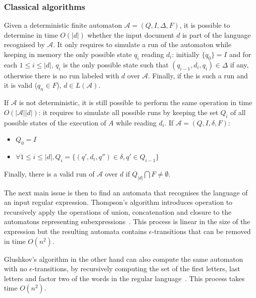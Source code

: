 \documentclass[12px]{article}
\theoremstyle{definition}
\begin{document}
      \subsubsection{Classical algorithms}

        Given a deterministic finite automaton $\mathcal{A} = (Q, I, \Delta,
        F)$, it is possible to determine in time $O(|d|)$ whether the input
        document $d$ is part of the language recognised by $\mathcal{A}$. It
        only requires to simulate a run of the automaton while keeping in
        memory the only possible state $q_i$ reading $d_i$: initially $\{q_0\}
        = I$ and for each $1 \leq i \leq |d|$, $q_{i}$ is the only possible
        state such that $(q_{i-1}, d_i, q_i) \in \Delta$ if any, otherwise
        there is no run labeled with $d$ over $\mathcal{A}$. Finally, if the is
        such a run and it is valid ($q_n \in F$), $d \in L(\mathcal{A})$.

        If $\mathcal{A}$ is not deterministic, it is still possible to perform
        the same operation in time $O(|\mathcal{A}| |d|)$: it requires to
        simulate all possible runs by keeping the set $Q_i$ of all possible
        states of the execution of $A$ while reading $d_i$. If $\mathcal{A} =
        (Q, I, \delta, F)$:
        \begin{itemize}
          \item $Q_0 = I$
          \item $\forall 1 \leq i \leq |d|, Q_i = \{(q', d_i, q'') \in \delta,
            q' \in Q_{i-1}\}$
        \end{itemize}
        Finally, there is a valid run of $\mathcal{A}$ over $d$ if $Q_{|d|}
        \bigcap F \neq \emptyset$.

        \vspace{0.5cm}

        The next main issue is then to find an automata that recognises the
        language of an input regular expression. Thompson's algorithm
        introduces operation to recursively apply the operations of union,
        concatenation and closure to the automatons representing
        subexpressions~\cite{thompson1968programming}. This process is linear
        in the size of the expression but the resulting automata contains
        $\epsilon$-transitions that can be removed in time $O(n^2)$.

        Glushkov's algorithm in the other hand can also compute the same
        automaton with no $\epsilon$-transitions, by recursively computing the
        set of the first letters, last letters and factor two of the words in
        the regular language~\cite{glushkov1961abstract}. This process takes
        time $O(n^2)$.
\end{document}

